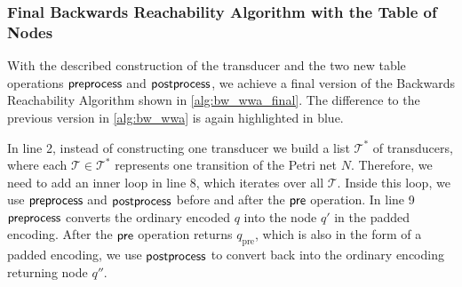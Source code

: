 %
%
%
%
%
%
\newpage

\subsubsection{Final Backwards Reachability Algorithm with the Table of Nodes}
With the described construction of the transducer and the two new table operations $\operatorname{\textsf{preprocess}}$ and $\operatorname{\textsf{postprocess}}$, we achieve a final version of the Backwards Reachability Algorithm shown in \autoref{alg:bw_wwa_final}. The difference to the previous version in \autoref{alg:bw_wwa} is again highlighted in blue.

In line 2, instead of constructing one transducer we build a list $\mathcal{T}^{*}$ of transducers, where each $\mathcal{T} \in \mathcal{T}^{*}$ represents one transition of the Petri net $N$. Therefore, we need to add an inner loop in line 8, which iterates over all $\mathcal{T}$. Inside this loop, we use $\operatorname{\textsf{preprocess}}$ and $\operatorname{\textsf{postprocess}}$ before and after the $\operatorname{\textsf{pre}}$ operation. In line 9 $\operatorname{\textsf{preprocess}}$ converts the ordinary encoded $q$ into the node $q'$ in the padded encoding. After the $\operatorname{\textsf{pre}}$ operation returns $q_{\text{pre}}$, which is also in the form of a padded encoding, we use $\operatorname{\textsf{postprocess}}$ to convert back into the ordinary encoding returning node $q''$.

